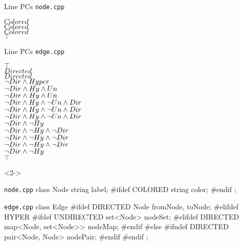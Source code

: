 \begin{frame}[fragile]{\myframetitle}
\begin{mycolumns}[t,columns=4,widths={31,20,20,29},animation=none]
{\begin{exampletight}{Line PCs \tiny\texttt{node.cpp}}
\begin{flushright}
					{\color{black}$Colored$}\\
					{\color{black}$Colored$}\\
					{\color{black}$Colored$}\\
					{\color{black}$\top$}
				\end{flushright}
			\end{exampletight}
			\begin{exampletight}{Line PCs \tiny\texttt{edge.cpp}}
				\tiny\vspace*{-1.3ex}
				\begin{flushright}
					{\color{black}$\top$}\\
					{\color{black}$Directed$}\\
					{\color{black}$Directed$}\\
					{\color{black}$\neg Dir \wedge Hyper$}\\
					{\color{black}$\neg Dir \wedge Hy \wedge Un$}\\
					{\color{black}$\neg Dir \wedge Hy \wedge Un$}\\
					{\color{black}$\neg Dir \wedge Hy \wedge \neg Un \wedge Dir$}\\
					{\color{black}$\neg Dir \wedge Hy \wedge \neg Un \wedge Dir$}\\
					{\color{black}$\neg Dir \wedge Hy \wedge \neg Un \wedge Dir$}\\
					{\color{black}$\neg Dir \wedge \neg Hy$}\\
					{\color{black}$\neg Dir \wedge \neg Hy \wedge \neg Dir$}\\
					{\color{black}$\neg Dir \wedge \neg Hy \wedge \neg Dir$}\\
					{\color{black}$\neg Dir \wedge \neg Hy \wedge \neg Dir$}\\
					{\color{black}$\neg Dir \wedge \neg Hy$}\\
					{\color{black}$\top$}
				\end{flushright}
			\end{exampletight}
		}
	\mynextcolumn
		\begin{uncoverenv}<2->
			\begin{cpptight}[basicstyle=\tiny]{\texttt{node.cpp}}
class Node {
	string label;
#ifdef COLORED
	string color;
#endif
};
			\end{cpptight}
			\begin{cpptight}[basicstyle=\tiny]{\texttt{edge.cpp}}
class Edge {
#ifdef DIRECTED
	Node fromNode, toNode;
#elifdef HYPER
#ifdef UNDIRECTED
	set<Node> nodeSet;
#elifdef DIRECTED
	map<Node, set<Node>> nodeMap;
#endif
#else
#ifndef DIRECTED
	pair<Node, Node> nodePair;
#endif
#endif
};
			\end{cpptight}
		\end{uncoverenv}
	\end{mycolumns}
\end{frame}

